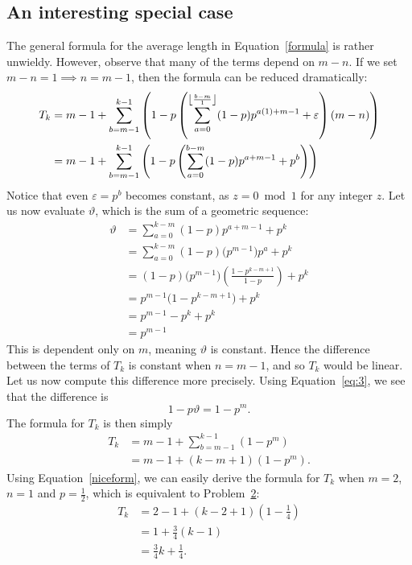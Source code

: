 \subsection{An interesting special case}
The general formula for the average length in Equation~\ref{formula} is rather unwieldy. However, observe that many of the terms depend on $m-n$. If we set  $m-n = 1 \implies n = m - 1$, then the formula can be reduced dramatically:
\begin{align}
  T_k &= m-1+\sum _{b=m-1}^{k-1} \left(1-p \left(\sum _{a=0}^{\floor*{\frac{b-m}{1}} } (1-p) p^{a (1)+m-1}+\varepsilon\right) (m-n)\right) \nonumber \\
      &= m-1+\sum _{b=m-1}^{k-1} \left(1-p \left(\sum _{a=0}^{b-m} (1-p) p^{a+m-1}+ p^{b} \right) \right) \label{eq:3}
\end{align}
Notice that even $\varepsilon = p^{b}$ becomes constant, as $z = 0 \bmod 1$ for any integer  $z$. Let us now evaluate $\vartheta$, which is the sum of a geometric sequence:
\begin{align*}
  \vartheta &= \sum_{a=0}^{k-m} (1-p)p^{a+m-1} + p^k \\
            &= \sum_{a=0}^{k-m} (1-p)\bigl(p^{m-1}\bigr)p^{a} + p^k \\
            &= (1-p)\bigl(p^{m-1}\bigr)\left(\frac{1-p^{k-m+1}}{1-p}\right) + p^k \\
            &= p^{m-1}\bigl(1-p^{k-m+1}\bigr) + p^k \\
            &= p^{m-1} - p^{k} + p^{k} \\
            &= p^{m-1}
\end{align*}
This is dependent only on $m$, meaning $\vartheta$ is constant. Hence the difference between the terms of $T_k$ is constant when $n = m-1$, and so $T_k$ would be linear. Let us now compute this difference more precisely. Using Equation~\ref{eq:3}, we see that the difference is \[
  1-p\vartheta = 1-p^{m}
.\] The formula for $T_k$ is then simply 
\begin{align}
  T_k &= m-1 + \sum_{b=m-1}^{k-1} \left(1-p^m\right) \nonumber \\
      &= m-1 + (k-m+1)\left(1 - p^m\right). \label{niceform}
\end{align}
Using Equation~\ref{niceform}, we can easily derive the formula for $T_k$ when $m = 2$, $n = 1$ and $p = \frac{1}{2}$, which is equivalent to Problem~\hyperlink{p2}{2}: 
\begin{align*}
  T_k &= 2 - 1 + (k-2+1)\left(1 - \frac{1}{4}\right) \\
      &= 1 + \frac{3}{4}(k-1) \\
      &= \frac{3}{4}k + \frac{1}{4}.
\end{align*}
